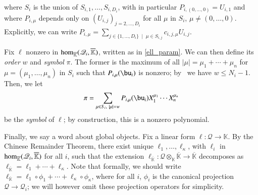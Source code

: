 \documentclass[final,1p,times,authoryear]{elsarticle}
\newcommand{\residueI}{\mathscr{Q}}
\def\dg{\kappa}
\def\K{\mathbb{K}}
\def\K {\ensuremath{\mathbb{K}}}
\def\Kbar {{\ensuremath{\overline{\mathbb{K}}}}}
\begin{document}
where $S_i$ is  the union of $S_{i,1},\dots,S_{i,D_i}$,
with in particular $P_{i,(0,\dots,0)}=U_{i,1}$ and where $P_{i,\mu}$
depends only on $(U_{i,j})_{j =2,\dots,D_i}$ for all $\mu$ in $S_i$,
$\mu \ne (0,\dots,0)$. Explicitly, we can write $P_{i,\mu}=\sum_{j\in
\{1,\dots,D_i\} \;\mid\; \mu \in S_{i,j}} c_{i,j,\mu}
U_{i,j}$. 

Fix $\ell$ nonzero in ${\rm hom}_\Kbar(\residueI_i,\Kbar)$, written
as in \cref{ell_param}. We can then
define its {\em order} $w$ and {\em symbol} $\pi$. The former is
the maximum of all $|\mu|=\mu_1+\cdots+\mu_n$ for
$\mu=(\mu_1,\dots,\mu_n)$ in $S_i$ such that $P_{i,\mu}(\bu_i)$ is
nonzero; by~\citep[Lemma~3.3]{Mourrain97} we have $w \le
N_i-1$. Then, we let
$$\pi =\sum_{\mu \in S_i,\ |\mu|=w}P_{i,\mu}(\bu_i) X_1^{\mu_1} \cdots
X_n^{\mu_n}$$ be the {\em symbol} of $\ell$; by construction,
this is a nonzero polynomial. 



Finally, we say a word about global objects.  Fix a linear form $\ell:
\residueI \to \K$. By the Chinese Remainder Theorem, there exist unique
$\ell_1,\dots,\ell_\dg$, with $\ell_i$ in ${\rm hom}_\Kbar(\residueI_i,\Kbar)$
for all $i$, such that the extension $\ell_\Kbar: \residueI\otimes_\K \Kbar
\to \Kbar$ decomposes as $\ell_\Kbar = \ell_1 + \cdots + \ell_\dg$.
Note that formally, we should write 
$\ell_\Kbar = \ell_1 \circ \phi_1 + \cdots + \ell_\dg \circ \phi_\dg$,
where for all $i$, $\phi_i$ is the canonical projection $\residueI \to \residueI_i$;
we will however omit these projection operators for simplicity.
\end{document}
